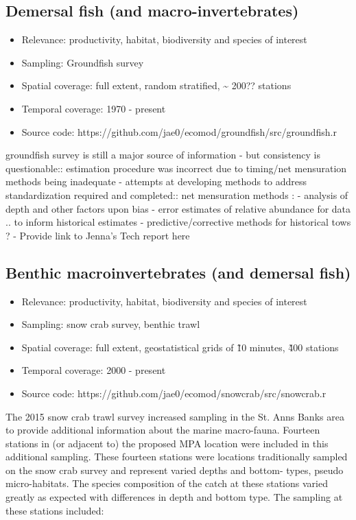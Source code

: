 \documentclass[letterpaper,portrait,11pt]{scrartcl}
\numberwithin{equation}{section}		%
\numberwithin{figure}{section}			%
\numberwithin{table}{section}				%
\begin{document}
\subsection{Demersal fish (and macro-invertebrates)}
\begin{itemize}
  \item Relevance:  productivity, habitat, biodiversity and species of interest
  \item Sampling:  Groundfish survey 
  \item Spatial coverage: full extent, random stratified, \~{} 200?? stations
  \item Temporal coverage: 1970 - present
  \item Source code: https://github.com/jae0/ecomod/groundfish/src/groundfish.r
\end{itemize}


groundfish survey is still a major source of information
- but consistency is questionable:: estimation procedure was incorrect due to timing/net mensuration methods being inadequate
- attempts at developing methods to address standardization required and completed:: net mensuration methods : 
- analysis of depth and other factors upon bias
- error estimates of relative abundance for data .. to inform historical estimates
- predictive/corrective methods for historical tows ?
- Provide link to Jenna's Tech report here



\subsection{Benthic macroinvertebrates (and demersal fish)}
\begin{itemize}
  \item Relevance:  productivity, habitat, biodiversity and species of interest
  \item Sampling:  snow crab survey, benthic trawl 
  \item Spatial coverage: full extent, geostatistical grids of \~10 minutes, \~400 stations
  \item Temporal coverage: 2000 - present
  \item Source code: https://github.com/jae0/ecomod/snowcrab/src/snowcrab.r
\end{itemize}

The 2015 snow crab trawl survey increased sampling in the St. Anns Banks area to provide additional information about the marine macro-fauna. Fourteen stations in (or adjacent to) the proposed MPA location were included in this additional sampling. These fourteen stations were locations traditionally sampled on the snow crab survey and represent varied depths and bottom- types, pseudo micro-habitats. The species composition of the catch at these stations varied greatly as expected with differences in depth and bottom type. The sampling at these stations included:
\end{document}
